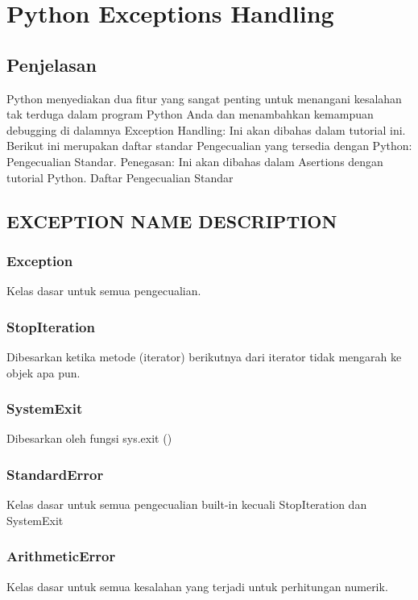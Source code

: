 
                                          \section{Python Exceptions Handling}

\subsection{Penjelasan}
Python menyediakan dua fitur yang sangat penting untuk menangani kesalahan tak terduga dalam program Python Anda dan menambahkan kemampuan debugging di dalamnya 
Exception Handling: Ini akan dibahas dalam tutorial ini. Berikut ini merupakan daftar standar Pengecualian yang tersedia dengan Python: Pengecualian Standar.
Penegasan: Ini akan dibahas dalam Asertions dengan tutorial Python. 
Daftar Pengecualian Standar 
\subsection{EXCEPTION NAME DESCRIPTION}

\subsubsection{Exception}
Kelas dasar untuk semua pengecualian.

\subsubsection{StopIteration}
Dibesarkan ketika metode (iterator) berikutnya dari iterator tidak mengarah ke objek apa pun.

\subsubsection{SystemExit}
Dibesarkan oleh fungsi sys.exit ()

\subsubsection{StandardError}
Kelas dasar untuk semua pengecualian built-in kecuali StopIteration dan SystemExit

\subsubsection{ArithmeticError}
Kelas dasar untuk semua kesalahan yang terjadi untuk perhitungan numerik.

